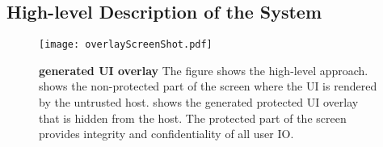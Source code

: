 \iffalse
\subsection{Challenges}


Modern user interfaces (UIs) are diverse and hard to generalize, resulting in many possible ways to provide input and receiving output.  This makes the protection of IO integrity, and confidentiality is a particularly challenging task. For example, given a mouse movement and clicking on a button from the user, it is necessary to understand the user intention that corresponds to the mouse movements. 


The second challenge arises while ensuring IO confidentiality. For mouse input, hiding the mouse movement while keeping all the regular functionality intact is a challenging task as we do not consider large TCB-based solution such as a trusted hypervisor.


Apart from these functional challenges for implementation, there exist multiple attack vectors that we want to provide protection. 
\fi

\subsection{High-level Description of the System}

\begin{figure}[t]
\centering
\texttt{[image: overlayScreenShot.pdf]}
\caption{\textbf{\device generated UI overlay} The figure shows the \name high-level approach. \one shows the non-protected part of the screen where the UI is rendered by the untrusted host. \two shows the \device generated protected UI overlay that is hidden from the host. The protected part of the screen provides integrity and confidentiality of all user IO.}
\spacesave
\label{fig:screenshot_1}
\end{figure}


